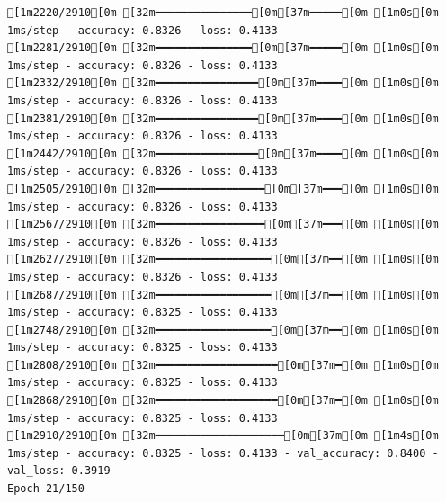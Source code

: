 \documentclass[
  letterpaper,
  DIV=11,
  numbers=noendperiod]{scrartcl}
\begin{document}
\begin{verbatim}
[1m2220/2910[0m [32m━━━━━━━━━━━━━━━[0m[37m━━━━━[0m [1m0s[0m 1ms/step - accuracy: 0.8326 - loss: 0.4133
[1m2281/2910[0m [32m━━━━━━━━━━━━━━━[0m[37m━━━━━[0m [1m0s[0m 1ms/step - accuracy: 0.8326 - loss: 0.4133
[1m2332/2910[0m [32m━━━━━━━━━━━━━━━━[0m[37m━━━━[0m [1m0s[0m 1ms/step - accuracy: 0.8326 - loss: 0.4133
[1m2381/2910[0m [32m━━━━━━━━━━━━━━━━[0m[37m━━━━[0m [1m0s[0m 1ms/step - accuracy: 0.8326 - loss: 0.4133
[1m2442/2910[0m [32m━━━━━━━━━━━━━━━━[0m[37m━━━━[0m [1m0s[0m 1ms/step - accuracy: 0.8326 - loss: 0.4133
[1m2505/2910[0m [32m━━━━━━━━━━━━━━━━━[0m[37m━━━[0m [1m0s[0m 1ms/step - accuracy: 0.8326 - loss: 0.4133
[1m2567/2910[0m [32m━━━━━━━━━━━━━━━━━[0m[37m━━━[0m [1m0s[0m 1ms/step - accuracy: 0.8326 - loss: 0.4133
[1m2627/2910[0m [32m━━━━━━━━━━━━━━━━━━[0m[37m━━[0m [1m0s[0m 1ms/step - accuracy: 0.8326 - loss: 0.4133
[1m2687/2910[0m [32m━━━━━━━━━━━━━━━━━━[0m[37m━━[0m [1m0s[0m 1ms/step - accuracy: 0.8325 - loss: 0.4133
[1m2748/2910[0m [32m━━━━━━━━━━━━━━━━━━[0m[37m━━[0m [1m0s[0m 1ms/step - accuracy: 0.8325 - loss: 0.4133
[1m2808/2910[0m [32m━━━━━━━━━━━━━━━━━━━[0m[37m━[0m [1m0s[0m 1ms/step - accuracy: 0.8325 - loss: 0.4133
[1m2868/2910[0m [32m━━━━━━━━━━━━━━━━━━━[0m[37m━[0m [1m0s[0m 1ms/step - accuracy: 0.8325 - loss: 0.4133
[1m2910/2910[0m [32m━━━━━━━━━━━━━━━━━━━━[0m[37m[0m [1m4s[0m 1ms/step - accuracy: 0.8325 - loss: 0.4133 - val_accuracy: 0.8400 - val_loss: 0.3919
Epoch 21/150


\end{verbatim}
\end{document}
